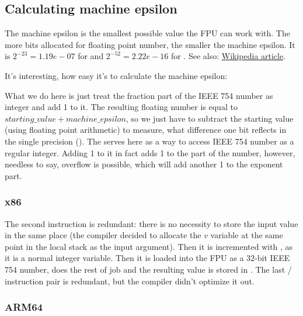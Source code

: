 ﻿\subsection{Calculating machine epsilon}

The machine epsilon is the smallest possible value the \ac{FPU} can work with.
The more bits allocated for floating point number, the smaller the machine epsilon.
It is $2^{-23} = 1.19e-07$ for \Tfloat and $2^{-52} = 2.22e-16$ for \Tdouble.
See also: \href{http://link.yurichev.com/17367}{Wikipedia article}.%

It's interesting, how easy it's to calculate the machine epsilon:



What we do here is just treat the fraction part of the IEEE 754 number as integer and add 1 to it.
The resulting floating number is equal to $starting\_value+machine\_epsilon$, so we just have to subtract
the starting value (using floating point arithmetic) to measure, what difference one bit reflects
in the single precision (\Tfloat).
The  serves here as a way to access IEEE 754 number as a regular integer.
Adding 1 to it in fact adds 1 to the  part of the number, however, needless to say,
overflow is possible, which will add another 1 to the exponent part.

\subsubsection{x86}



The second  instruction is redundant: there is no necessity to store the input value in the same
place (the compiler decided to allocate the $v$ variable at the same point in the local stack as the input 
argument).
Then it is incremented with , as it is a normal integer variable.
Then it is loaded into the FPU as a 32-bit IEEE 754 number,  does the rest of job and the resulting
value is stored in .
The last / instruction pair is redundant, but the compiler didn't optimize it out.

\subsubsection{ARM64}

